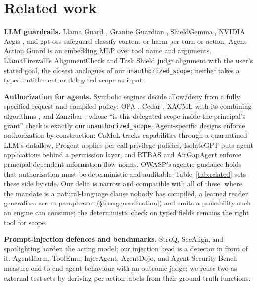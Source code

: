 \section{Related work}
\label{sec:related}

\textbf{LLM guardrails.} Llama Guard \citep{inan2023llamaguard}, Granite
Guardian \citep{padhi2024graniteguardian}, ShieldGemma
\citep{zeng2024shieldgemma}, NVIDIA Aegis \citep{ghosh2024aegis}, and
gpt-oss-safeguard \citep{openai2025gptosssafeguard} classify content or harm
per turn or action; Agent Action Guard \citep{agentactionguard2025} is an
embedding MLP over tool name and arguments. LlamaFirewall's AlignmentCheck
\citep{chennabasappa2025llamafirewall} and Task Shield
\citep{jia2025taskshield} judge alignment with the user's stated goal, the
closest analogues of our \texttt{unauthorized\_scope}; neither takes a typed
entitlement or delegated scope as input.

\textbf{Authorization for agents.} Symbolic engines decide allow/deny from a
fully specified request and compiled policy: OPA \citep{opa}, Cedar
\citep{cutler2024cedar}, XACML with its combining algorithms
\citep{oasis2013xacml}, and Zanzibar \citep{pang2019zanzibar}, whose
``is this delegated scope inside the principal's grant'' check is exactly our
\texttt{unauthorized\_scope}. Agent-specific designs enforce authorization by
construction: CaMeL \citep{debenedetti2025camel} tracks capabilities through
a quarantined LLM's dataflow, Progent \citep{shi2025progent} applies
per-call privilege policies, IsolateGPT \citep{wu2025isolategpt} puts agent
applications behind a permission layer, and RTBAS \citep{zhong2025rtbas} and
AirGapAgent \citep{bagdasarian2024airgapagent} enforce principal-dependent
information-flow norms. OWASP's agentic guidance \citep{owasp2025agentic}
holds that authorization must be deterministic and auditable. Table~\ref{tab:related} sets these side by side. Our delta is
narrow and compatible with all of these: where the mandate is a
natural-language clause nobody has compiled, a learned reader generalises
across paraphrases (\S\ref{sec:generalisation}) and emits a probability such
an engine can consume; the deterministic check on typed fields remains the
right tool for scope.

\textbf{Prompt-injection defences and benchmarks.} StruQ, SecAlign, and
spotlighting \citep{chen2024struq,chen2025secalign,hines2024spotlighting}
harden the acting model; our injection head is a detector in front of it.
AgentHarm, ToolEmu, InjecAgent, AgentDojo, and Agent Security Bench
\citep{andriushchenko2024agentharm,ruan2023toolemu,zhan2024injecagent,debenedetti2024agentdojo,zhang2025asb}
measure end-to-end agent behaviour with an outcome judge; we reuse two as
external test sets by deriving per-action labels from their ground-truth
functions.
